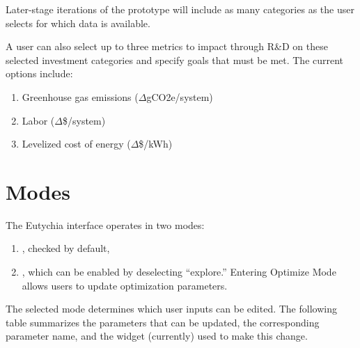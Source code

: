 \documentclass[letterpaper,10pt,english]{sphinxmanual}
\begin{document}
Later-stage iterations of the prototype will include as many categories
as the user selects for which data is available.

 A user can also select up to three metrics to impact through
R\&D on these selected investment categories and specify goals that must
be met. The current options include:
\begin{enumerate}
\def\theenumi{\arabic{enumi}}
\def\labelenumi{\theenumi .}
\makeatletter\def\p@enumii{\p@enumi \theenumi .}\makeatother
\item {} 
Greenhouse gas emissions (\(\Delta\)gCO2e/system)

\item {} 
Labor (\(\Delta\)\$/system)

\item {} 
Levelized cost of energy (\(\Delta\)\$/kWh)

\end{enumerate}


\section{Modes}
\label{\detokenize{doc-src/user-interface:modes}}
The Eutychia interface operates in two modes:
\begin{enumerate}
\def\theenumi{\arabic{enumi}}
\def\labelenumi{\theenumi .}
\makeatletter\def\p@enumii{\p@enumi \theenumi .}\makeatother
\item {} 
, checked by default,

\item {} 
, which can be enabled by deselecting “explore.” Entering Optimize Mode allows users to update optimization parameters.

\end{enumerate}

The selected mode determines which user inputs can be edited. The
following table summarizes the parameters that can be updated, the
corresponding  parameter name, and the widget (currently)
used to make this change.
\end{document}

